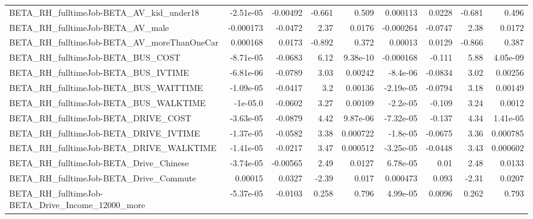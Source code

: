 \begin{tabular}{lrrrrrrrr}
BETA\_RH\_fulltimeJob-BETA\_AV\_kid\_under18            &   -2.51e-05 &     -0.00492 &    -0.661 &    0.509 &   0.000113 &      0.0228 &       -0.681 &         0.496 \\
BETA\_RH\_fulltimeJob-BETA\_AV\_male                   &   -0.000173 &      -0.0472 &      2.37 &   0.0176 &  -0.000264 &     -0.0747 &         2.38 &        0.0172 \\
BETA\_RH\_fulltimeJob-BETA\_AV\_moreThanOneCar         &    0.000168 &       0.0173 &    -0.892 &    0.372 &    0.00013 &      0.0129 &       -0.866 &         0.387 \\
BETA\_RH\_fulltimeJob-BETA\_BUS\_COST                  &   -8.71e-05 &      -0.0683 &      6.12 & 9.38e-10 &  -0.000168 &      -0.111 &         5.88 &      4.05e-09 \\
BETA\_RH\_fulltimeJob-BETA\_BUS\_IVTIME                &   -6.81e-06 &      -0.0789 &      3.03 &  0.00242 &   -8.4e-06 &     -0.0834 &         3.02 &       0.00256 \\
BETA\_RH\_fulltimeJob-BETA\_BUS\_WAITTIME              &   -1.09e-05 &      -0.0417 &       3.2 &  0.00136 &  -2.19e-05 &     -0.0794 &         3.18 &       0.00149 \\
BETA\_RH\_fulltimeJob-BETA\_BUS\_WALKTIME              &    -1e-05.0 &      -0.0602 &      3.27 &  0.00109 &   -2.2e-05 &      -0.109 &         3.24 &        0.0012 \\
BETA\_RH\_fulltimeJob-BETA\_DRIVE\_COST                &   -3.63e-05 &      -0.0879 &      4.42 & 9.87e-06 &  -7.32e-05 &      -0.137 &         4.34 &      1.41e-05 \\
BETA\_RH\_fulltimeJob-BETA\_DRIVE\_IVTIME              &   -1.37e-05 &      -0.0582 &      3.38 & 0.000722 &   -1.8e-05 &     -0.0675 &         3.36 &      0.000785 \\
BETA\_RH\_fulltimeJob-BETA\_DRIVE\_WALKTIME            &   -1.41e-05 &      -0.0217 &      3.47 & 0.000512 &  -3.25e-05 &     -0.0448 &         3.43 &      0.000602 \\
BETA\_RH\_fulltimeJob-BETA\_Drive\_Chinese             &   -3.74e-05 &     -0.00565 &      2.49 &   0.0127 &   6.78e-05 &        0.01 &         2.48 &        0.0133 \\
BETA\_RH\_fulltimeJob-BETA\_Drive\_Commute             &     0.00015 &       0.0327 &     -2.39 &    0.017 &   0.000473 &       0.093 &        -2.31 &        0.0207 \\
BETA\_RH\_fulltimeJob-BETA\_Drive\_Income\_12000\_more   &   -5.37e-05 &      -0.0103 &     0.258 &    0.796 &   4.99e-05 &      0.0096 &        0.262 &         0.793 \\

\end{tabular}
